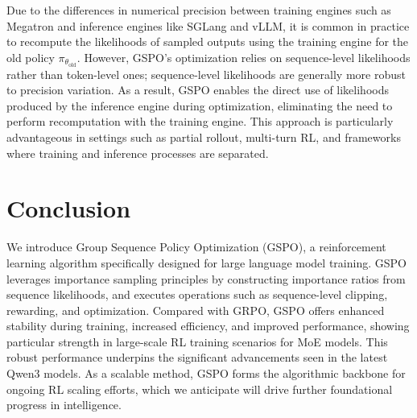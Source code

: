 Due to the differences in numerical precision between training engines such as Megatron and inference engines like SGLang and vLLM, it is common in practice to recompute the likelihoods of sampled outputs using the training engine for the old policy $\pi_{\theta_\text{old}}$. However, GSPO’s optimization relies on sequence-level likelihoods rather than token-level ones; sequence-level likelihoods are generally more robust to precision variation. As a result, GSPO enables the direct use of likelihoods produced by the inference engine during optimization, eliminating the need to perform recomputation with the training engine. This approach is particularly advantageous in settings such as partial rollout, multi-turn RL, and frameworks where training and inference processes are separated.

\section{Conclusion}

We introduce Group Sequence Policy Optimization (GSPO), a reinforcement learning algorithm specifically designed for large language model training. GSPO leverages importance sampling principles by constructing importance ratios from sequence likelihoods, and executes operations such as sequence-level clipping, rewarding, and optimization. Compared with GRPO, GSPO offers enhanced stability during training, increased efficiency, and improved performance, showing particular strength in large-scale RL training scenarios for MoE models. This robust performance underpins the significant advancements seen in the latest Qwen3 models. As a scalable method, GSPO forms the algorithmic backbone for ongoing RL scaling efforts, which we anticipate will drive further foundational progress in intelligence.

